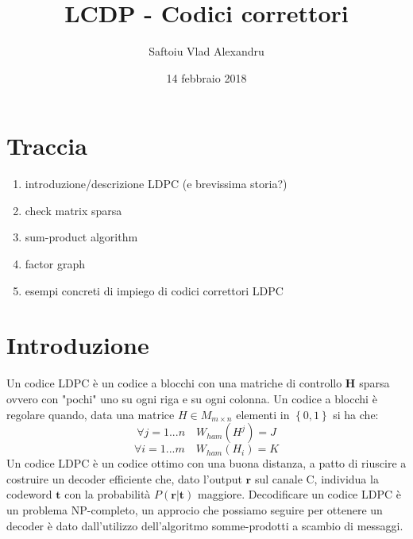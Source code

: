 \documentclass{article}
\title{LCDP - Codici correttori}
\date{14 febbraio 2018}
\author{Saftoiu Vlad Alexandru}
\begin{document}
	\maketitle
	\newpage

	\tableofcontents
	\newpage


	\section{Traccia}
	\begin{enumerate}
		\item introduzione/descrizione LDPC (e brevissima storia?)
		\item check matrix sparsa 
		\item sum-product algorithm
		\item factor graph
		\item esempi concreti di impiego di codici correttori LDPC
	\end{enumerate}

	\section{Introduzione}
	Un codice LDPC è un codice a blocchi con una matriche di controllo $\textbf{H}$ sparsa ovvero con "pochi" uno su ogni riga e su ogni colonna. Un codice a blocchi è regolare quando, data una matrice $H \in M_{m \times n}$ elementi in $\left\{0,1\right\}$ si ha che:
	\begin{equation}
		  \forall j =1 ... n \quad W_{ham}(H^j) = J 
	\end{equation}
	\begin{equation}
		\forall i = 1 ... m \quad W_{ham}(H_i) = K
	\end{equation}
	Un codice LDPC è un codice ottimo con una buona distanza, a patto di riuscire a costruire un decoder efficiente che, dato l'output $\textbf{r}$ sul canale C, individua la codeword $\textbf{t}$ con la probabilità $P(\textbf{r}|\textbf{t})$ maggiore. Decodificare un codice LDPC è un problema NP-completo, un approcio che possiamo seguire per ottenere un decoder è dato dall'utilizzo dell'algoritmo somme-prodotti a scambio di messaggi.
\end{document}
